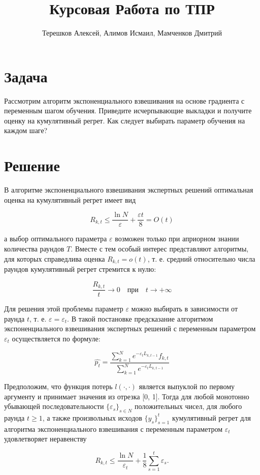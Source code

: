 \documentclass{article}
\title{Курсовая Работа по ТПР}
\author{Терешков Алексей, Алимов Исмаил, Мамченков Дмитрий}
\date{}
\begin{document}
\maketitle

\section{Задача}
Рассмотрим алгоритм экспоненциального взвешивания на основе градиента с переменным шагом обучения. Приведите исчерпывающие выкладки и получите оценку на кумулятивный регрет. Как следует выбирать параметр обучения на каждом шаге?

\section{Решение}
В алгоритме экспоненциального взвешивания экспертных решений оптимальная
оценка на кумулятивный регрет имеет вид

\[
R_{k,t} \le \frac{\ln{N}}{\varepsilon} + \frac{\varepsilon t}{8} = O(t) 
\]

а выбор оптимального параметра $\varepsilon$ возможен только при априорном знании количества раундов $T$. Вместе с тем особый интерес представляют алгоритмы, для которых справедлива оценка $R_{k,t} =o(t)$, т. е. средний относительно числа раундов кумулятивный регрет стремится к нулю: 

\[
\frac{R_{k,t}}{t} \rightarrow 0 \quad при \quad t \rightarrow +\infty
\]

Для решения этой проблемы параметр $\varepsilon$ можно выбирать в зависимости от раунда $t$, т. е. $\varepsilon = \varepsilon_t$. В такой постановке предсказание алгоритмом экспоненциального взвешивания экспертных решений с переменным параметром $\varepsilon_t$ осуществляется по формуле:

\[
\hat{p_t} = \frac{\sum^N_{k=1} e^{-\varepsilon_tL_{k,t-1}} f_{k,t} }{\sum^N_{k=1} e^{-\varepsilon_tL_{k,t-1}}} 
\]

Предположим, что функция потерь $l(\cdot, \cdot)$ является выпуклой по первому аргументу и принимает значения из отрезка [0, 1]. Тогда для любой монотонно убывающей последовательности $\{\varepsilon_s\}_{s\in N}$ положительных чисел, для любого раунда $t \ge 1$, а также произвольных исходов $\{y_s\}^t_{s=1}$ кумулятивный регрет для алгоритма экспоненциального взвешивания с переменным параметром $\varepsilon_t$ удовлетворяет неравенству

\[
R_{k,t} \le \frac{\ln{N}}{\varepsilon_t} + \frac{1}{8} \sum^t_{s=1} \varepsilon_s.
\]
\end{document}
